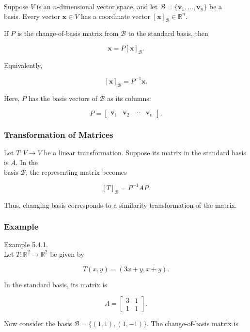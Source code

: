 \documentclass[
  12pt,
  a4paper,
]{article}
\begin{document}
Suppose \(V\) is an \(n\)-dimensional vector space, and let
\(\mathcal{B} = \{\mathbf{v}_1, \dots, \mathbf{v}_n\}\) be a\\
basis. Every vector \(\mathbf{x} \in V\) has a coordinate vector
\([\mathbf{x}]_{\mathcal{B}} \in \mathbb{R}^n\).

If \(P\) is the change-of-basis matrix from \(\mathcal{B}\) to the
standard basis, then

\[\mathbf{x} = P [\mathbf{x}]_{\mathcal{B}}.\]

Equivalently,

\[[\mathbf{x}]_{\mathcal{B}} = P^{-1} \mathbf{x}.\]

Here, \(P\) has the basis vectors of \(\mathcal{B}\) as its columns:

\[P = \begin{bmatrix}
\mathbf{v}_1 & \mathbf{v}_2 & \cdots & \mathbf{v}_n
\end{bmatrix}.\]

\subsubsection{Transformation of
Matrices}\label{transformation-of-matrices}

Let \(T: V \to V\) be a linear transformation. Suppose its matrix in the
standard basis is \(A\). In the\\
basis \(\mathcal{B}\), the representing matrix becomes

\[[T]_{\mathcal{B}} = P^{-1} A P.\]

Thus, changing basis corresponds to a similarity transformation of the
matrix.

\subsubsection{Example}\label{example-4}

Example 5.4.1.\\
Let \(T:\mathbb{R}^2 \to \mathbb{R}^2\) be given by

\[T(x,y) = (3x + y, x + y).\]

In the standard basis, its matrix is

\[A = \begin{bmatrix}
3 & 1 \\
1 & 1
\end{bmatrix}.\]

Now consider the basis \(\mathcal{B} = \{ (1,1), (1,-1) \}\). The
change-of-basis matrix is
\end{document}
